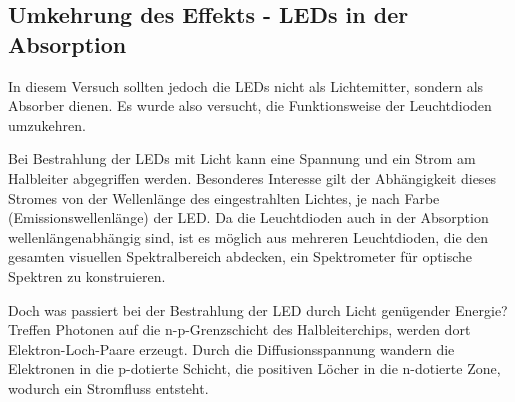\documentclass[11pt]{scrartcl}
\begin{document}
\subsection{Umkehrung des Effekts - LEDs in der Absorption}
In diesem Versuch sollten jedoch die LEDs nicht als Lichtemitter, sondern als Absorber dienen. Es wurde also versucht, die Funktionsweise der Leuchtdioden umzukehren.

Bei Bestrahlung der LEDs mit Licht kann eine Spannung und ein Strom am Halbleiter abgegriffen werden. Besonderes Interesse gilt der Abhängigkeit dieses Stromes von der Wellenlänge des eingestrahlten Lichtes, je nach Farbe (Emissionswellenlänge) der LED. Da die Leuchtdioden auch in der Absorption wellenlängenabhängig sind, ist es möglich aus mehreren Leuchtdioden, die den gesamten visuellen Spektralbereich abdecken, ein Spektrometer für optische Spektren zu konstruieren.

Doch was passiert bei der Bestrahlung der LED durch Licht genügender Energie? Treffen Photonen auf die n-p-Grenzschicht des Halbleiterchips, werden dort Elektron-Loch-Paare erzeugt. Durch die Diffusionsspannung wandern die Elektronen in die p-dotierte Schicht, die positiven Löcher in die n-dotierte Zone, wodurch ein Stromfluss entsteht.
\end{document}
